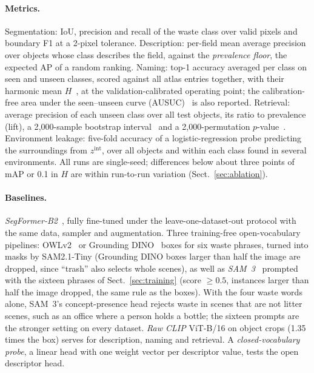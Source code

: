 \documentclass[pdflatex,sn-basic,Numbered]{sn-jnl}%
\begin{document}
\paragraph{Metrics.} Segmentation: IoU, precision and recall of the waste class over valid pixels and boundary F1 at a 2-pixel tolerance. Description: per-field mean average precision over objects whose class describes the field, against the \emph{prevalence floor}, the expected AP of a random ranking. Naming: top-1 accuracy averaged per class on seen and unseen classes, scored against all atlas entries together, with their harmonic mean $H$~\cite{xian2019gzsl}, at the validation-calibrated operating point; the calibration-free area under the seen--unseen curve (AUSUC)~\cite{chao2016gzsl} is also reported. Retrieval: average precision of each unseen class over all test objects, its ratio to prevalence (lift), a 2{,}000-sample bootstrap interval~\cite{efron1979bootstrap} and a 2{,}000-permutation $p$-value~\cite{ojala2010permutation}. Environment leakage: five-fold accuracy of a logistic-regression probe predicting the surroundings from $z^{\mathrm{int}}$, over all objects and within each class found in several environments. All runs are single-seed; differences below about three points of mAP or 0.1 in $H$ are within run-to-run variation (Sect.~\ref{sec:ablation}).

\paragraph{Baselines.} \emph{SegFormer-B2}~\cite{xie2021segformer}, fully fine-tuned under the leave-one-dataset-out protocol with the same data, sampler and augmentation. Three training-free open-vocabulary pipelines: OWLv2~\cite{minderer2023owlv2} or Grounding DINO~\cite{liu2024groundingdino} boxes for six waste phrases, turned into masks by SAM2.1-Tiny (Grounding DINO boxes larger than half the image are dropped, since ``trash'' also selects whole scenes), as well as \emph{SAM~3}~\cite{carion2025sam3} prompted with the sixteen phrases of Sect.~\ref{sec:training} (score $\ge0.5$, instances larger than half the image dropped, the same rule as the boxes). With the four waste words alone, SAM~3's concept-presence head rejects waste in scenes that are not litter scenes, such as an office where a person holds a bottle; the sixteen prompts are the stronger setting on every dataset. \emph{Raw CLIP} ViT-B/16 on object crops (1.35 times the box) serves for description, naming and retrieval. A \emph{closed-vocabulary probe}, a linear head with one weight vector per descriptor value, tests the open descriptor head.
\end{document}
